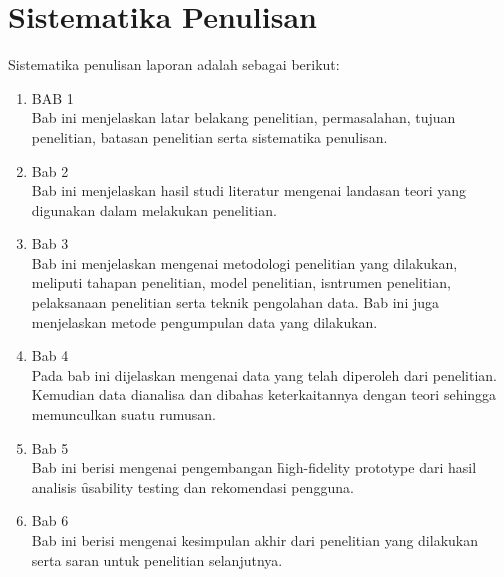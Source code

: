 \section{Sistematika Penulisan}
Sistematika penulisan laporan adalah sebagai berikut:
\begin{enumerate}
	\item BAB 1 \babSatu \\
	Bab ini menjelaskan latar belakang penelitian, permasalahan, tujuan penelitian, batasan penelitian serta sistematika penulisan. 
	\item Bab 2 \babDua \\
	Bab ini menjelaskan hasil studi literatur mengenai landasan teori yang digunakan dalam melakukan penelitian.
	\item Bab 3 \babTiga \\
	Bab ini menjelaskan mengenai metodologi penelitian yang dilakukan, meliputi tahapan penelitian, model penelitian, isntrumen penelitian, pelaksanaan penelitian serta teknik pengolahan data. Bab ini juga menjelaskan metode pengumpulan data yang dilakukan.
	\item Bab 4 \babEmpat \\
	Pada bab ini dijelaskan mengenai data yang telah diperoleh dari penelitian. Kemudian data dianalisa dan dibahas keterkaitannya dengan teori sehingga memunculkan suatu rumusan.
	\item Bab 5 \babLima \\
	Bab ini berisi mengenai pengembangan \f{high-fidelity prototype} dari hasil analisis \f{usability testing} dan rekomendasi pengguna. 
	\item Bab 6 \babEnam \\
	Bab ini berisi mengenai kesimpulan akhir dari penelitian yang dilakukan serta saran untuk penelitian selanjutnya.
\end{enumerate}

